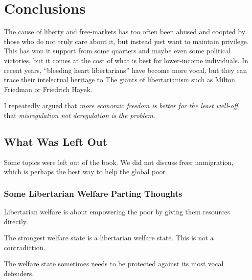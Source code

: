 \chapter{Conclusions}

The cause of liberty and free-markets has too often been abused and coopted by
those who do not truly care about it, but instead just want to maintain
privilege. This has won it support from some quarters and maybe even some
political victories, but it comes at the cost of what is best for lower-income
individuals. In recent years, ``bleeding heart libertarians'' have become more
vocal, but they can trace their intelectual heritage to The giants of
libertarianism such as Milton Friedman or Friedrich Hayek.

I repeatedly argued that \emph{more economic freedom is better for the least
well-off}, that \emph{misregulation not deregulation is the problem}.

\section{What Was Left Out}

Some topics were left out of the book. We did not discuss freer immigration,
which is perhaps the best way to help the global poor. 

\subsection{Some Libertarian Welfare Parting Thoughts}

\thought Libertarian welfare is about empowering the poor by giving them
resources directly.

\thought The strongest welfare state is a libertarian welfare state. This is
not a contradiction.

\thought The welfare state sometimes needs to be protected against its most
vocal defenders.

